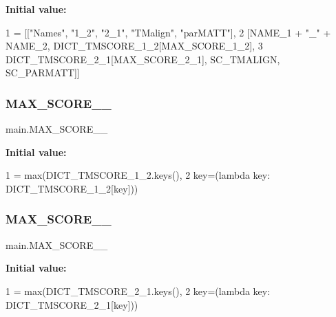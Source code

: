 {\bfseries Initial value\+:}
\begin{DoxyCode}
1 =  [[\textcolor{stringliteral}{"Names"}, \textcolor{stringliteral}{"1\_2"}, \textcolor{stringliteral}{"2\_1"}, \textcolor{stringliteral}{"TMalign"}, \textcolor{stringliteral}{"parMATT"}],
2                   [NAME\_1 + \textcolor{stringliteral}{"\_"} + NAME\_2, DICT\_TMSCORE\_1\_2[MAX\_SCORE\_1\_2],
3                    DICT\_TMSCORE\_2\_1[MAX\_SCORE\_2\_1], SC\_TMALIGN, SC\_PARMATT]]
\end{DoxyCode}
\mbox{\label{namespacemain_a15d77db6a950ce4f7f3b38fd115794b7}} 
\subsubsection{\texorpdfstring{M\+A\+X\+\_\+\+S\+C\+O\+R\+E\+\_\+\_}{MAX\_SCORE\_1\_2}}
{\footnotesize\ttfamily main.\+M\+A\+X\+\_\+\+S\+C\+O\+R\+E\+\_\+\_}

{\bfseries Initial value\+:}
\begin{DoxyCode}
1 =  max(DICT\_TMSCORE\_1\_2.keys(),
2                         key=(\textcolor{keyword}{lambda} key: DICT\_TMSCORE\_1\_2[key]))
\end{DoxyCode}
\mbox{\label{namespacemain_a6a94a21e6dc9f0a6de7fd5fe98620d2b}} 
\subsubsection{\texorpdfstring{M\+A\+X\+\_\+\+S\+C\+O\+R\+E\+\_\+\_}{MAX\_SCORE\_2\_1}}
{\footnotesize\ttfamily main.\+M\+A\+X\+\_\+\+S\+C\+O\+R\+E\+\_\+\_}

{\bfseries Initial value\+:}
\begin{DoxyCode}
1 =  max(DICT\_TMSCORE\_2\_1.keys(),
2                         key=(\textcolor{keyword}{lambda} key: DICT\_TMSCORE\_2\_1[key]))
\end{DoxyCode}
